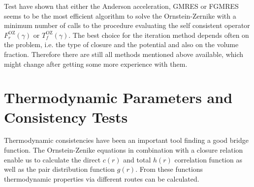 Test have shown that either the Anderson acceleration, GMRES or FGMRES seems to be the most efficient algorithm to solve the Ornstein-Zernike with a minimum number of calls to the procedure evaluating the self consistent operator $F^\mathrm{OZ}_r(\gamma)$ or $T^\mathrm{OZ}_f(\gamma)$. The best choice for the iteration method depends often on the problem, i.e. the type of closure and the potential and also on the volume fraction. Therefore there are still all methods mentioned above available, which might change after getting some more experience with them.

\section{Thermodynamic Parameters and Consistency Tests}

Thermodynamic consistencies have been an important tool finding a good bridge function.
The Ornstein-Zenike equations in combination with a closure relation enable us to calculate
the direct $c(r)$ and total $h(r)$ correlation function  as well as the pair distribution function $g(r)$.
From these functions thermodynamic properties via different routes can be calculated.


